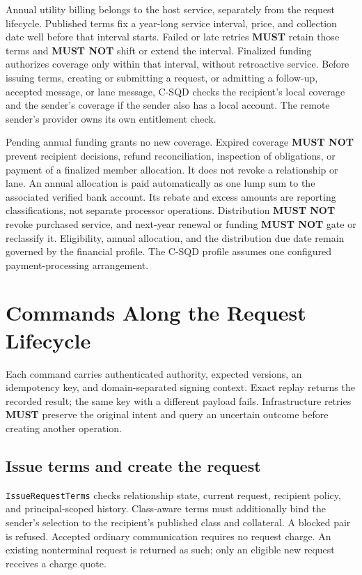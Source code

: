 \documentclass[11pt]{article}
\newcommand{\MUST}{\textbf{MUST}}
\newcommand{\MUSTNOT}{\textbf{MUST NOT}}
\begin{document}
Annual utility billing belongs to the host service, separately from the request
lifecycle. Published terms fix a year-long service interval, price, and collection
date well before that interval starts. Failed or late retries \MUST{} retain
those terms and \MUSTNOT{} shift or extend the interval. Finalized funding
authorizes coverage only within that interval, without retroactive service. Before
issuing terms, creating or submitting a request, or admitting a follow-up,
accepted message, or lane message, C-SQD checks the recipient's local coverage and
the sender's coverage if the sender also has a local account. The remote sender's
provider owns its own entitlement check.

Pending annual funding grants no new coverage. Expired coverage \MUSTNOT{}
prevent recipient decisions, refund reconciliation, inspection of obligations,
or payment of a finalized member allocation. It does not revoke a relationship
or lane. An annual allocation is paid automatically as one lump sum to the
associated verified bank account. Its rebate and excess amounts are reporting
classifications, not separate processor operations. Distribution \MUSTNOT{}
revoke purchased service, and next-year renewal or funding \MUSTNOT{} gate or
reclassify it. Eligibility, annual allocation, and the distribution due date
remain governed by the financial profile. The C-SQD profile assumes one
configured payment-processing arrangement.

\section{Commands Along the Request Lifecycle}

Each command carries authenticated authority, expected versions, an idempotency
key, and domain-separated signing context. Exact replay returns the recorded
result; the same key with a different payload fails. Infrastructure retries
\MUST{} preserve the original intent and query an uncertain outcome before
creating another operation.

\subsection{Issue terms and create the request}

\texttt{IssueRequestTerms} checks relationship state, current request, recipient
policy, and principal-scoped history. Class-aware terms must additionally bind
the sender's selection to the recipient's published class and collateral. A blocked pair is refused. Accepted ordinary
communication requires no request charge. An existing nonterminal request is
returned as such; only an eligible new request receives a charge quote.
\end{document}
